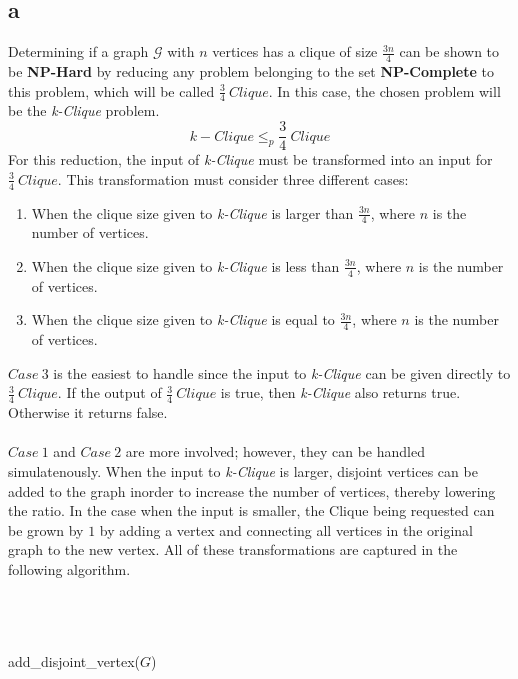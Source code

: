 \documentclass[12pt]{article}
\begin{document}
\subsection*{a}
Determining if a graph $\mathcal{G}$ with $n$
vertices has a clique of size $\frac{3n}{4}$ can be shown to be
\textbf{NP-Hard} by reducing any problem belonging to the set
\textbf{NP-Complete} to this problem, which will be called \textit{$\frac{3}{4}\ Clique$}.
In this case, the chosen problem will be the \textit{k-Clique} problem.
\[
k-Clique \leq_{p} \frac{3}{4}\ Clique
\]
For this reduction, the input of \textit{k-Clique} must be transformed
into an input for $\frac{3}{4}\ Clique$.  This transformation must
consider three different cases:
\begin{enumerate}
    \item When the clique size given to \textit{k-Clique} is larger than
          $\frac{3n}{4}$, where $n$ is the number of vertices.
    \item When the clique size given to \textit{k-Clique} is less than
          $\frac{3n}{4}$, where $n$ is the number of vertices.   
    \item When the clique size given to \textit{k-Clique} is equal to 
          $\frac{3n}{4}$, where $n$ is the number of vertices.   
\end{enumerate}
$Case\ 3$ is the easiest to handle since the input to \textit{k-Clique}
can be given directly to $\frac{3}{4}\ Clique$.  If the output of 
$\frac{3}{4}\ Clique$ is true, then \textit{k-Clique} also returns true.
Otherwise it returns false.\\\\
$Case\ 1$ and $Case\ 2$ are more involved; however, they can be handled
simulatenously.  When the input to \textit{k-Clique} is larger, disjoint
vertices can be added to the graph inorder to increase the number of vertices,
thereby lowering the ratio.  In the case when the input is smaller, the
Clique being requested can be grown by $1$ by adding a vertex and 
connecting all vertices in the original graph to the new vertex.
All of these transformations are captured in the following algorithm.\\\\    
\begin{algorithm}[H]
\\
\\
{
    {
        add\_disjoint\_vertex($G$)   
    }
}
\end{algorithm}
\end{document}
